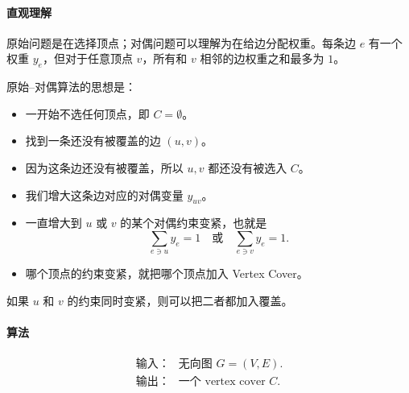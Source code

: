\documentclass[UTF8,openany,12pt]{ctexbook}
\theoremstyle{remark}
\begin{document}
\paragraph{直观理解}

原始问题是在选择顶点；对偶问题可以理解为在给边分配权重。每条边
\(e\) 有一个权重 \(y_e\)，但对于任意顶点 \(v\)，所有和 \(v\) 相邻的边权重之和最多为 \(1\)。

原始--对偶算法的思想是：

\begin{itemize}
  \item 一开始不选任何顶点，即 \(C=\emptyset\)。
  \item 找到一条还没有被覆盖的边 \((u,v)\)。
  \item 因为这条边还没有被覆盖，所以 \(u,v\) 都还没有被选入 \(C\)。
  \item 我们增大这条边对应的对偶变量 \(y_{uv}\)。
  \item 一直增大到 \(u\) 或 \(v\) 的某个对偶约束变紧，也就是
  \[
    \sum_{e\ni u}y_e = 1
    \quad\text{或}\quad
    \sum_{e\ni v}y_e = 1.
  \]
  \item 哪个顶点的约束变紧，就把哪个顶点加入 Vertex Cover。
\end{itemize}

如果 \(u\) 和 \(v\) 的约束同时变紧，则可以把二者都加入覆盖。

\paragraph{算法}

\[
\begin{array}{ll}
\textbf{输入：} & \text{无向图 } G=(V,E).\\
\textbf{输出：} & \text{一个 vertex cover } C.
\end{array}
\]
\end{document}
